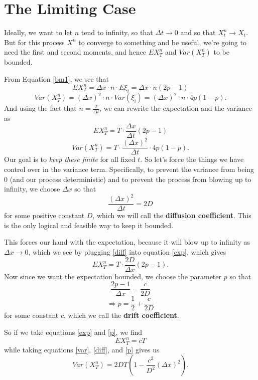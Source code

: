 \documentclass[a4paper,12pt]{scrartcl}
\begin{document}
\section{The Limiting Case}

Ideally, we want to let $n$ tend to infinity, so that $\Delta t 
\rightarrow 0$ and so that $X^n_t \rightarrow X_t$.  But for this process
$X^n$ to converge to something and be useful, we're going to need the
first and second moments, and hence $EX^n_T$ and $Var(X^n_T)$ to be 
bounded.

From Equation \ref{bm1}, we see that
   \[ EX^n_T  = \Delta x \cdot n \cdot E\xi_i = \Delta x \cdot n(2p-1) \]
   \[Var(X^n_T) = (\Delta x)^2 \cdot n \cdot Var(\xi_i) = 
      (\Delta x)^2 \cdot n \cdot 4p(1-p). \]
And using the fact that $n = \frac{T}{\Delta t}$, we can rewrite the
expectation and the variance as 
\begin{equation} 
   \label{exp}
   EX^n_T = T \cdot \frac{ \Delta x}{\Delta t} (2p-1) 
\end{equation}
\begin{equation}
   \label{var}
   Var(X^n_T) = T \cdot \frac{(\Delta x)^2 }{\Delta t} \cdot 4p(1-p).
\end{equation}
Our goal is to \emph{keep these finite} for all fixed $t$. So let's 
force the things we have control over in the variance term.
Specifically, to prevent the variance from being 0 (and our process 
deterministic) and to prevent the process from blowing up to infinity, 
we choose $\Delta x$ so that 
\begin{equation}
   \label{diff}
   \frac{(\Delta x)^2}{\Delta t} = 2D 
\end{equation}
for some positive constant $D$, which we will call the \textbf{diffusion
coefficient}. This is the only logical and feasible way to keep it
bounded.

This forces our hand with the expectation, because it will blow up to
infinity as $\Delta x \rightarrow 0$, which we see by plugging 
\ref{diff} into equation \ref{exp}, which gives 
   \[ EX^n_T = T \cdot \frac{ 2D}{\Delta x} (2p-1). \]
Now since we want the expectation bounded, we choose the parameter $p$
so that 
   \[ \frac{2p - 1}{\Delta x} = \frac{c}{2D} \]
\begin{equation}
   \label{p}
   \Rightarrow p = \frac{1}{2} + \frac{c}{2D} 
\end{equation}
for some constant $c$, which we call the \textbf{drift coefficient}. 

So if we take equations \ref{exp} and \ref{p}, we find
   \[ EX^n_T = cT \]
while taking equations \ref{var}, \ref{diff}, and \ref{p} gives us
   \[ Var(X^n_T)= 2DT \left( 1 - \frac{c^2}{D^2} (\Delta x)^2 \right).\]
\end{document}
